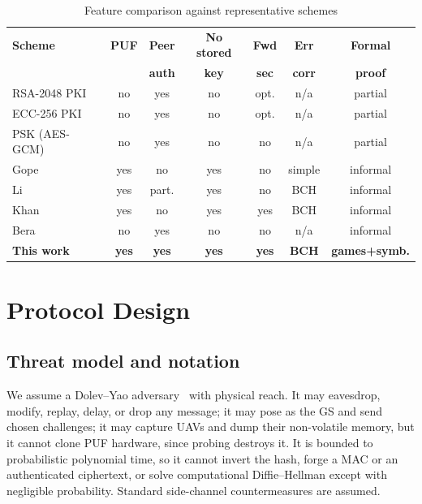 \documentclass[conference]{IEEEtran}
\begin{document}
\begin{table}[H]
\centering
\caption{Feature comparison against representative schemes}
\label{tab:related}
\scriptsize
\setlength{\tabcolsep}{2.6pt}
\begin{tabular}{@{}lcccccc@{}}
\toprule
\textbf{Scheme} & \textbf{PUF} & \textbf{Peer} & \textbf{No stored} &
\textbf{Fwd} & \textbf{Err} & \textbf{Formal} \\
 & & \textbf{auth} & \textbf{key} & \textbf{sec} & \textbf{corr} & \textbf{proof} \\
\midrule
RSA-2048 PKI                       & no  & yes  & no  & opt. & n/a    & partial \\
ECC-256 PKI                        & no  & yes  & no  & opt. & n/a    & partial \\
PSK (AES-GCM)                      & no  & yes  & no  & no   & n/a    & partial \\
Gope~\cite{puf_lightweight_uav}    & yes & no   & yes & no   & simple & informal \\
Li~\cite{puf_uav_cross_domain}     & yes & part.& yes & no   & BCH    & informal \\
Khan~\cite{puf_6g_uav}             & yes & no   & yes & yes  & BCH    & informal \\
Bera~\cite{peer2peer_auth}         & no  & yes  & no  & no   & n/a    & informal \\
\textbf{This work}                 & \textbf{yes} & \textbf{yes} & \textbf{yes}
                                   & \textbf{yes} & \textbf{BCH} & \textbf{games+symb.} \\
\bottomrule
\end{tabular}
\end{table}

\section{Protocol Design}
\label{sec:protocol}

\subsection{Threat model and notation}

We assume a Dolev--Yao adversary~\cite{dolev_yao} with physical reach. It may
eavesdrop, modify, replay, delay, or drop any message; it may pose as the GS and
send chosen challenges; it may capture UAVs and dump their non-volatile memory,
but it cannot clone PUF hardware, since probing destroys it. It is bounded to
probabilistic polynomial time, so it cannot invert the hash, forge a MAC or an
authenticated ciphertext, or solve computational Diffie--Hellman except with
negligible probability. Standard side-channel countermeasures are assumed.
\end{document}
